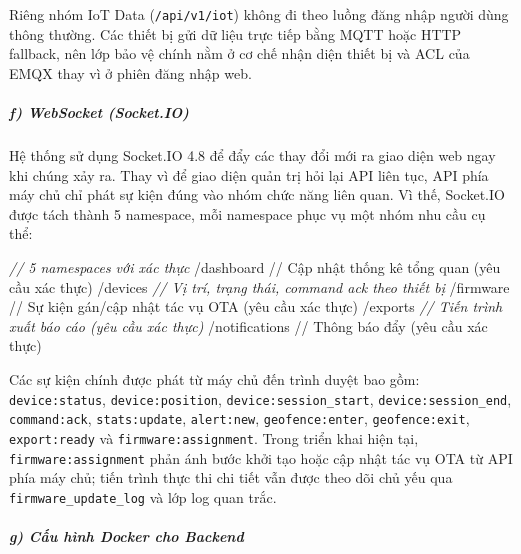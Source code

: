 \documentclass[a4paper]{extarticle}
\newenvironment{Shaded}{}{}
\newcommand{\CommentTok}[1]{\textcolor[rgb]{0.38,0.63,0.69}{\textit{#1}}}
\newcommand{\FunctionTok}[1]{\textcolor[rgb]{0.02,0.16,0.49}{#1}}
\newcommand{\NormalTok}[1]{#1}
\newcommand{\OperatorTok}[1]{\textcolor[rgb]{0.40,0.40,0.40}{#1}}
\newcommand{\SpecialCharTok}[1]{\textcolor[rgb]{0.25,0.44,0.63}{#1}}
\newcommand{\SpecialStringTok}[1]{\textcolor[rgb]{0.73,0.40,0.53}{#1}}
\begin{document}
Riêng nhóm IoT Data (\texttt{/api/v1/iot}) không đi theo luồng đăng nhập
người dùng thông thường. Các thiết bị gửi dữ liệu trực tiếp bằng MQTT
hoặc HTTP fallback, nên lớp bảo vệ chính nằm ở cơ chế nhận diện thiết bị
và ACL của EMQX thay vì ở phiên đăng nhập web.

\subparagraph{f) WebSocket (Socket.IO)}\label{f-websocket-socketio}

Hệ thống sử dụng Socket.IO 4.8 để đẩy các thay đổi mới ra giao diện web
ngay khi chúng xảy ra. Thay vì để giao diện quản trị hỏi lại API liên
tục, API phía máy chủ chỉ phát sự kiện đúng vào nhóm chức năng liên
quan. Vì thế, Socket.IO được tách thành 5 namespace, mỗi namespace phục
vụ một nhóm nhu cầu cụ thể:

\begin{Shaded}
\begin{Highlighting}[]
\CommentTok{// 5 namespaces với xác thực}
\SpecialStringTok{/dashboard      // Cập nhật thống kê tổng quan }\SpecialCharTok{(}\SpecialStringTok{yêu cầu xác thực}\SpecialCharTok{)}
\SpecialStringTok{/devices}        \CommentTok{// Vị trí, trạng thái, command ack theo thiết bị}
\SpecialStringTok{/firmware       // Sự kiện gán/cập}\NormalTok{ nhật tác vụ }\FunctionTok{OTA}\NormalTok{ (yêu cầu xác thực)}
\OperatorTok{/}\NormalTok{exports        }\CommentTok{// Tiến trình xuất báo cáo (yêu cầu xác thực)}
\SpecialStringTok{/notifications  // Thông báo đẩy }\SpecialCharTok{(}\SpecialStringTok{yêu cầu xác thực}\SpecialCharTok{)}
\end{Highlighting}
\end{Shaded}

Các sự kiện chính được phát từ máy chủ đến trình duyệt bao gồm:
\texttt{device:status}, \texttt{device:position},
\texttt{device:session\_start}, \texttt{device:session\_end},
\texttt{command:ack}, \texttt{stats:update}, \texttt{alert:new},
\texttt{geofence:enter}, \texttt{geofence:exit}, \texttt{export:ready}
và \texttt{firmware:assignment}. Trong triển khai hiện tại,
\texttt{firmware:assignment} phản ánh bước khởi tạo hoặc cập nhật tác vụ
OTA từ API phía máy chủ; tiến trình thực thi chi tiết vẫn được theo dõi chủ yếu
qua \texttt{firmware\_update\_log} và lớp log quan trắc.

\subparagraph{g) Cấu hình Docker cho
Backend}\label{g-cux1ea5u-huxecnh-docker-cho-backend}
\end{document}
